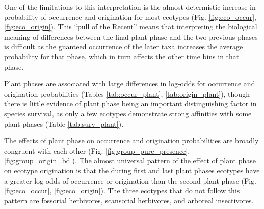 \documentclass[12pt,letterpaper]{article}
\begin{document}
One of the limitations to this interpretation is the almost determistic increase in probability of occurrence and origination for most ecotypes (Fig. \ref{fig:eco_occur}, \ref{fig:eco_origin}). This ``pull of the Recent'' means that interpreting the biological meaning of differences between the final plant phase and the two previous phases is difficult as the guanteed occurrence of the later taxa increases the average probability for that phase, which in turn affects the other time bins in that phase.

Plant phases are associated with large differences in log-odds for occurrence and origination probabilities (Tables \ref{tab:occur_plant}, \ref{tab:origin_plant}), though there is little evidence of plant phase being an important distinguishing factor in species survival, as only a few ecotypes demonstrate strong affinities with some plant phases (Table \ref{tab:surv_plant}). 

The effects of plant phase on occurrence and origination probabilities are broadly congruent with each other (Fig. \ref{fig:group_pure_presence}, \ref{fig:group_origin_bd}). The almost universal pattern of the effect of plant phase on ecotype origination is that the during first and last plant phases ecotypes have a greater log-odds of occurrence or origination than the second plant phase (Fig. \ref{fig:eco_occur}, \ref{fig:eco_origin}). The three ecotypes that do not follow this pattern are fossorial herbivores, scansorial herbivores, and arboreal insectivores.
\end{document}
